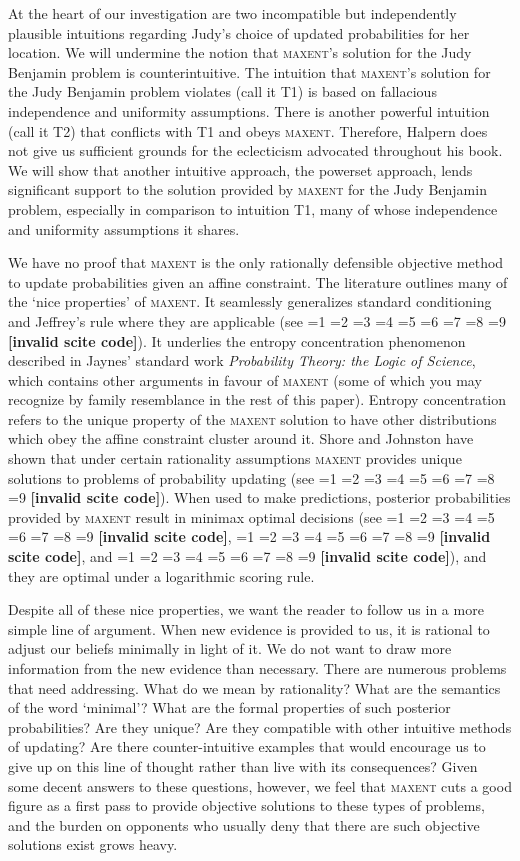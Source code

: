 \documentclass[smallextended]{svjour3}       %
\newcommand{\qnull}[1]{`#1'}
\newcommand{\PageP}{p.~}
\newcommand{\PageP}{}
\newcommand{\scite}[3]{\ifnum#1=1\cite{#2}\else
\ifnum#1=2\cite[{\PageP}~#3]{#2}\else
\ifnum#1=3\cite[{\PageP}~#3]{#2}\else
\ifnum#1=4\cite{#2}\else
\ifnum#1=5\cite{#2}\else
\ifnum#1=6\cite[{\PageP}~#3]{#2}\else
\ifnum#1=7\cite{#2}\else
\ifnum#1=8\cite[{\PageP}~#3]{#2}\else
\ifnum#1=9\cite[{\PageP}~#3]{#2}\else
\textbf{[invalid scite code]}\fi\fi\fi\fi\fi\fi\fi\fi\fi}
\begin{document}
At the heart of our investigation are two incompatible but
independently plausible intuitions regarding Judy's choice of updated
probabilities for her location. We will undermine the notion that
\textsc{maxent}'s solution for the Judy Benjamin problem is
counterintuitive. The intuition that \textsc{maxent}'s solution for
the Judy Benjamin problem violates (call it T1) is based on fallacious
independence and uniformity assumptions. There is another powerful
intuition (call it T2) that conflicts with T1 and obeys
\textsc{maxent}. Therefore, Halpern does not give us sufficient
grounds for the eclecticism advocated throughout his book. We will
show that another intuitive approach, the powerset approach, lends
significant support to the solution provided by \textsc{maxent} for
the Judy Benjamin problem, especially in comparison to intuition T1,
many of whose independence and uniformity assumptions it shares. 

We have no proof that \textsc{maxent} is the only rationally
defensible objective method to update probabilities given an affine
constraint. The literature outlines many of the \qnull{nice
  properties} of \textsc{maxent}. It seamlessly generalizes standard
conditioning and Jeffrey's rule where they are applicable (see
\scite{7}{catichagiffin06}{}). It underlies the entropy concentration
phenomenon described in Jaynes' standard work \emph{Probability
  Theory: the Logic of Science}, which contains other arguments in
favour of \textsc{maxent} (some of which you may recognize by family
resemblance in the rest of this paper). Entropy concentration refers
to the unique property of the \textsc{maxent} solution to have other
distributions which obey the affine constraint cluster around it.
Shore and Johnston have shown that under certain rationality
assumptions \textsc{maxent} provides unique solutions to problems of
probability updating (see \scite{7}{shorejohnson80}{}). When used to
make predictions, posterior probabilities provided by \textsc{maxent}
result in minimax optimal decisions (see \scite{7}{topsoe79}{},
\scite{7}{walley91}{}, and \scite{7}{grunwald00a}{}), and they are
optimal under a logarithmic scoring rule.

Despite all of these nice properties, we want the reader to follow us
in a more simple line of argument. When new evidence is provided to
us, it is rational to adjust our beliefs minimally in light of it. We
do not want to draw more information from the new evidence than
necessary. There are numerous problems that need addressing. What do
we mean by rationality? What are the semantics of the word
\qnull{minimal}? What are the formal properties of such posterior
probabilities? Are they unique? Are they compatible with other
intuitive methods of updating? Are there counter-intuitive examples
that would encourage us to give up on this line of thought rather than
live with its consequences? Given some decent answers to these
questions, however, we feel that \textsc{maxent} cuts a good figure as
a first pass to provide objective solutions to these types of
problems, and the burden on opponents who usually deny that there are
such objective solutions exist grows heavy.
\end{document}
